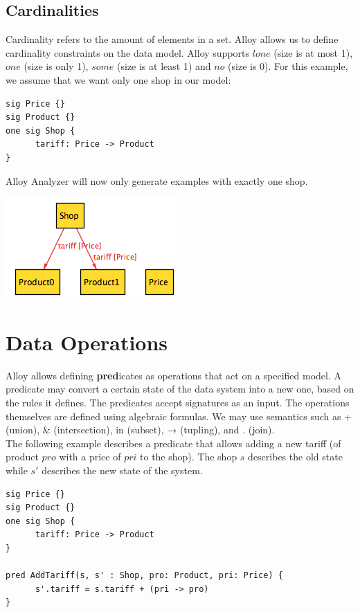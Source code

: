 \documentclass[oneside]{book}
\begin{document}
\subsection{Cardinalities}

Cardinality refers to the amount of elements in a set. Alloy allows us to define cardinality constraints on the data model. Alloy supports $lone$ (size is at most 1), $one$ (size is only 1), $some$ (size is at least 1) and $no$ (size is 0). For this example, we assume that we want only one shop in our model:

\begin{lstlisting}
sig Price {}
sig Product {}
one sig Shop {
	  tariff: Price -> Product
}
\end{lstlisting}

Alloy Analyzer will now only generate examples with exactly one shop. 

\begin{center}
\includegraphics[scale=0.6]{shop2}
\end{center}

\newpage

\section{Data Operations}
Alloy allows defining \textbf{pred}icates as operations that act on a specified model. A predicate may convert a certain state of the data system into a new one, based on the rules it defines. The predicates accept signatures as an input. The operations themselves are defined using algebraic formulas. We may use semantics such as + (union), \& (intersection), in (subset), → (tupling), and . (join).\\

The following example describes a predicate that allows adding a new tariff (of product $pro$ with a price of $pri$ to the shop). The shop $s$ describes the old state while $s'$ describes the new state of the system.

\begin{lstlisting}
sig Price {}
sig Product {}
one sig Shop {
	  tariff: Price -> Product
}

pred AddTariff(s, s' : Shop, pro: Product, pri: Price) {
	  s'.tariff = s.tariff + (pri -> pro)
}
\end{lstlisting}
\end{document}
